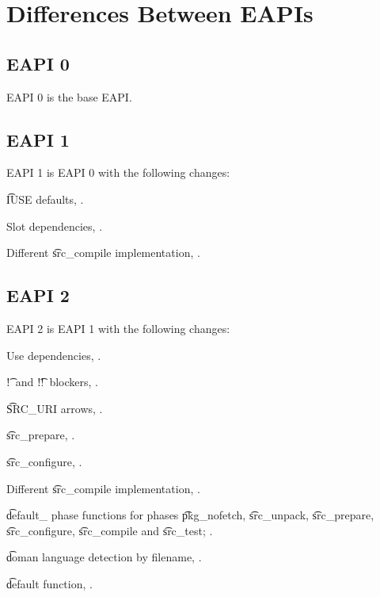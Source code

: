 \chapter{Differences Between EAPIs}


\section{EAPI 0}

EAPI 0 is the base EAPI.

\section{EAPI 1}

EAPI 1 is EAPI 0 with the following changes:

\begin{compactitem}
\item \t{IUSE} defaults, .
\item Slot dependencies, .
\item Different \t{src_compile} implementation, .
\end{compactitem}

\section{EAPI 2}

EAPI 2 is EAPI 1 with the following changes:

\begin{compactitem}
\item Use dependencies, .
\item \t{!}\ and \t{!!}\ blockers, .
\item \t{SRC_URI} arrows, .
\item \t{src_prepare}, .
\item \t{src_configure}, .
\item Different \t{src_compile} implementation, .
\item \t{default_} phase functions for phases \t{pkg_nofetch}, \t{src_unpack}, \t{src_prepare},
    \t{src_configure}, \t{src_compile} and \t{src_test}; .
\item \t{doman} language detection by filename, .
\item \t{default} function, .
\end{compactitem}

